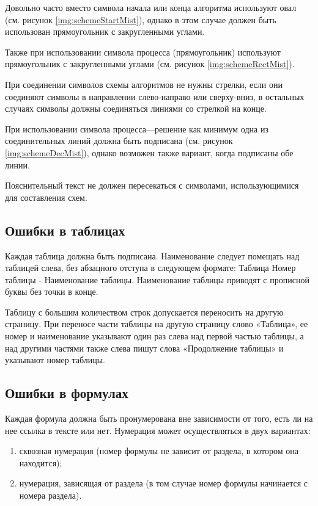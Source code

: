 Довольно часто вместо символа начала или конца алгоритма используют овал (см. рисунок \ref{img:schemeStartMist}), однако в этом случае должен быть использован прямоугольник с закругленными углами.

Также при использовании символа процесса (прямоугольник) используют прямоугольник с закругленными углами (см. рисунок \ref{img:schemeRectMist}).

При соединении символов схемы алгоритмов не нужны стрелки, если они соединяют символы в направлении слево-направо или сверху-вниз, в остальных случаях символы должны соединяться линиями со стрелкой на конце.

При использовании символа процесса---решение как минимум одна из соединительных линий должна быть подписана (см. рисунок \ref{img:schemeDecMist}), однако возможен также вариант, когда подписаны обе линии.

Пояснительный текст не должен пересекаться с символами, использующимися для составления схем.

\subsection{Ошибки в таблицах}
Каждая таблица должна быть подписана. Наименование следует помещать над таблицей слева, без абзацного отступа в следующем формате: Таблица Номер таблицы - Наименование таблицы. Наименование таблицы приводят с прописной буквы без точки в конце\cite{GOST732}.

Таблицу с большим количеством строк допускается переносить на другую страницу. При переносе части таблицы на другую страницу слово «Таблица», ее номер и наименование указывают один раз слева над первой частью таблицы, а над другими частями также слева пишут слова «Продолжение таблицы» и указывают номер таблицы\cite{GOST732}.

\subsection{Ошибки в формулах}
Каждая формула должна быть пронумерована вне зависимости от того, есть ли на нее ссылка в тексте или нет. Нумерация может осуществляться в двух вариантах:
\begin{enumerate}
	\item сквозная нумерация (номер формулы не зависит от раздела, в котором она находится);
	\item нумерация, зависящая от раздела (в том случае номер формулы начинается с номера раздела).
\end{enumerate}

